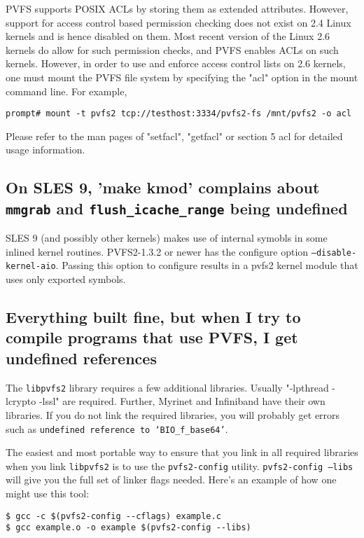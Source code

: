 \documentclass[11pt,letterpaper]{article}
\begin{document}
PVFS supports POSIX ACLs by storing them as extended attributes. However, support
for access control based permission checking does not exist on 2.4 Linux kernels and is hence disabled on them.
Most recent version of the Linux 2.6 kernels do allow for such permission checks, and PVFS enables
ACLs on such kernels.
However, in order to use and enforce access control lists on 2.6 kernels, one must mount
the PVFS file system by specifying the "acl" option in the mount command line. For example,
\begin{verbatim}
prompt# mount -t pvfs2 tcp://testhost:3334/pvfs2-fs /mnt/pvfs2 -o acl
\end{verbatim}
Please refer to the man pages of "setfacl", "getfacl" or section 5 acl for detailed usage
information.

\subsection{On SLES 9, 'make kmod' complains about \texttt{mmgrab} and
 \texttt{flush\_icache\_range} being undefined}

SLES 9 (and possibly other kernels) makes use of internal symobls in some
inlined kernel routines.  PVFS2-1.3.2 or newer has the configure option
\texttt{--disable-kernel-aio}.  Passing this option to configure results in a pvfs2
kernel module that uses only exported symbols.  

\subsection{Everything built fine, but when I try to compile programs that use PVFS, I get undefined references}
\label{sec:undefined_references}

The \texttt{libpvfs2} library requires a few additional libraries.  Usually
"-lpthread -lcrypto -lssl" are required.  Further, Myrinet and Infiniband have
their own libraries.  If you do not link the required libraries, you will
probably get errors such as \texttt{undefined reference to `BIO\_f\_base64'}.

The easiest and most portable way to ensure that you link in all required
libraries when you link \texttt{libpvfs2} is to use the \texttt{pvfs2-config}
utility.  \texttt{pvfs2-config --libs} will give you the full set of linker
flags needed.  Here's an example of how one might use this tool:
\begin{verbatim}
$ gcc -c $(pvfs2-config --cflags) example.c 
$ gcc example.o -o example $(pvfs2-config --libs) 
\end{verbatim}
\end{document}
